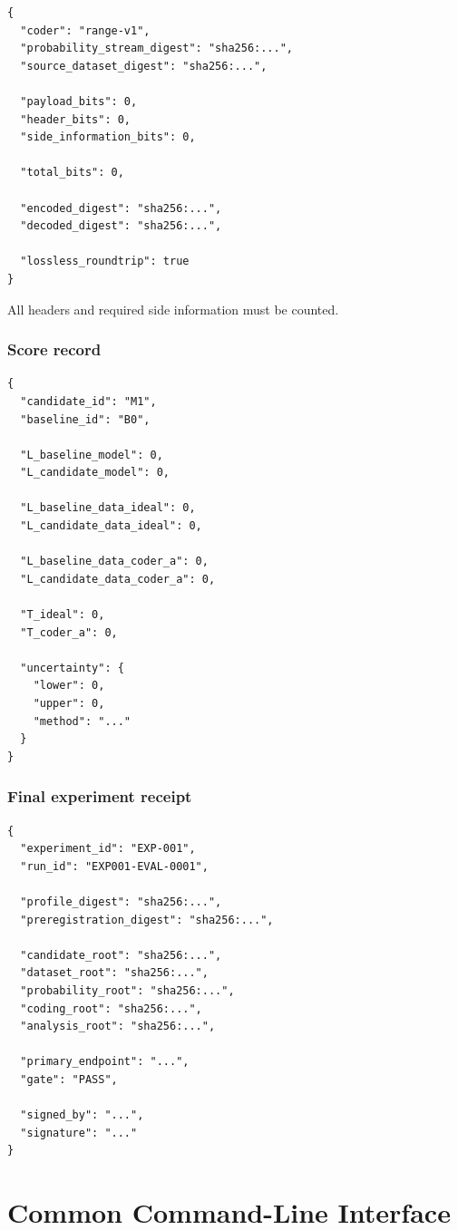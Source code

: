 \documentclass[11pt]{article}
\begin{document}
\begin{verbatim}
{
  "coder": "range-v1",
  "probability_stream_digest": "sha256:...",
  "source_dataset_digest": "sha256:...",

  "payload_bits": 0,
  "header_bits": 0,
  "side_information_bits": 0,

  "total_bits": 0,

  "encoded_digest": "sha256:...",
  "decoded_digest": "sha256:...",

  "lossless_roundtrip": true
}
\end{verbatim}
All headers and required side information must be counted.

\section{Score record}

\begin{verbatim}
{
  "candidate_id": "M1",
  "baseline_id": "B0",

  "L_baseline_model": 0,
  "L_candidate_model": 0,

  "L_baseline_data_ideal": 0,
  "L_candidate_data_ideal": 0,

  "L_baseline_data_coder_a": 0,
  "L_candidate_data_coder_a": 0,

  "T_ideal": 0,
  "T_coder_a": 0,

  "uncertainty": {
    "lower": 0,
    "upper": 0,
    "method": "..."
  }
}
\end{verbatim}

\section{Final experiment receipt}

\begin{verbatim}
{
  "experiment_id": "EXP-001",
  "run_id": "EXP001-EVAL-0001",

  "profile_digest": "sha256:...",
  "preregistration_digest": "sha256:...",

  "candidate_root": "sha256:...",
  "dataset_root": "sha256:...",
  "probability_root": "sha256:...",
  "coding_root": "sha256:...",
  "analysis_root": "sha256:...",

  "primary_endpoint": "...",
  "gate": "PASS",

  "signed_by": "...",
  "signature": "..."
}
\end{verbatim}

\part{Common Command-Line Interface}
\end{document}
